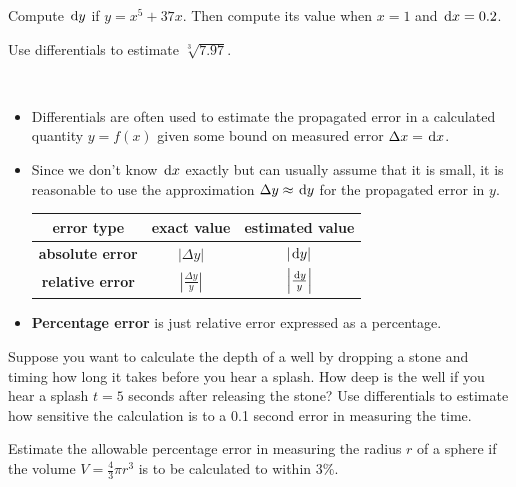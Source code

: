 \newpage

\begin{example}
Compute $\mkern 2mu \mathrm{d} y$ if $y=x^5+37x$.
Then compute its value when $x=1$ and $\mkern 2mu \mathrm{d} x=0.2$.
\end{example}
\vfill

\begin{example}
Use differentials to estimate $\sqrt[3]{7.97}$.
\end{example}
\vfill

\newpage


\begin{remark}\,
\begin{itemize}
\item Differentials are often used to estimate the propagated error in a calculated quantity $y=f(x)$ given some bound on measured error $\Delta x = \mkern 2mu \mathrm{d} x$.
\item Since we don't know $\mkern 2mu \mathrm{d} x$ exactly but can usually assume that it is small, it is reasonable to use the approximation $\Delta y\approx \mkern 2mu \mathrm{d} y$ for the propagated error in $y$.
\begin{center}
\begin{tabular}{c||cc}
error type & exact value & estimated value\\
\hline\hline
\textbf{absolute error} & $|\Delta y|$ & $|\mkern 2mu \mathrm{d} y|$\\

\textbf{relative error} & $\left|\frac{\Delta y}{y}\right|$ & $\left|\frac{\mkern 2mu \mathrm{d} y}{y}\right|$
\end{tabular}
\end{center}
\item \textbf{Percentage error} is just relative error expressed as a percentage.
\end{itemize}
\end{remark}

\begin{example}
Suppose you want to calculate the depth of a well by dropping a stone and timing how long it takes before you hear a splash.
How deep is the well if you hear a splash $t=5$ seconds after releasing the stone?
Use differentials to estimate how sensitive the calculation is to a 0.1 second error in measuring the time.  
\end{example}

\newpage

\begin{example}
Estimate the allowable percentage error in measuring the radius $r$ of a sphere if the volume $V=\frac{4}{3}\pi r^3$ is to be calculated to within $3\%$.
\end{example}
